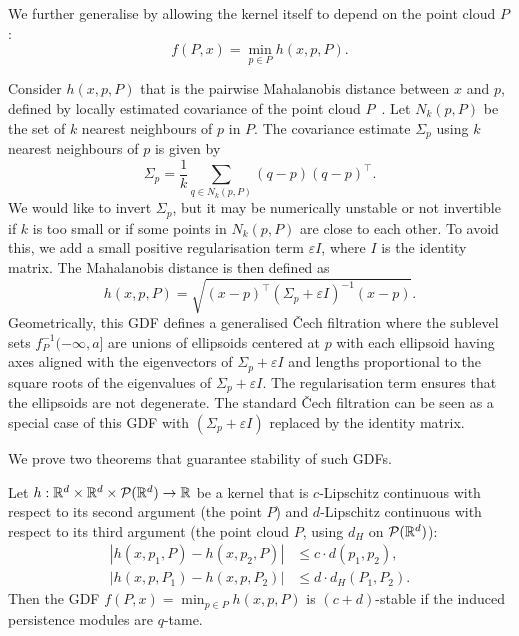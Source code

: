 We further generalise by allowing the kernel itself to depend on the point cloud
$P$:
\begin{equation}
    f(P, x) = \min_{p \in P} h(x, p, P).
\end{equation}
\begin{example}
    \label{ex:mahalanobis}
    Consider $h(x, p, P)$ that is the pairwise Mahalanobis distance between $x$
    and $p$, defined by locally estimated covariance of the point cloud
    $P$~\cite{mclachlan1999mahalanobis}.
    Let $N_k(p, P)$ be the set of $k$ nearest neighbours of $p$ in $P$. The
    covariance estimate $\Sigma_p$ using $k$ nearest neighbours of $p$ is given
    by
    \begin{equation}
        \Sigma_p = \frac{1}{k} \sum_{q \in N_k(p, P)} (q - p)(q - p)^\top.
    \end{equation}
    We would like to invert $\Sigma_p$, but it may be numerically unstable or
    not invertible if $k$ is too small or if some points in $N_k(p, P)$ are
    close to each other. To avoid this, we add a small positive
    regularisation term $\varepsilon I$, where $I$ is the identity matrix.
    The Mahalanobis distance is then defined as
    \begin{equation}
        h(x, p, P) = \sqrt{(x - p)^\top (\Sigma_p + \varepsilon I)^{-1} (x - p)}.
    \end{equation}
    Geometrically, this GDF defines a generalised \v{C}ech filtration where the
    sublevel sets $f_P^{-1}(-\infty, a]$ are unions of ellipsoids centered at
    $p$ with each ellipsoid having axes aligned with the eigenvectors of
    $\Sigma_p + \varepsilon I$ and lengths proportional to the square roots of
    the eigenvalues of $\Sigma_p + \varepsilon I$. The regularisation term
    ensures that the ellipsoids are not degenerate. The standard \v{C}ech
    filtration can be seen as a special case of this GDF with
    $(\Sigma_p + \varepsilon I)$ replaced by the identity matrix.
\end{example}
We prove two theorems that guarantee stability of such GDFs.
\begin{theorem}
    \label{thm:pc_kernel_stability}
    Let $h : \mathbb{R}^d \times \mathbb{R}^d \times \mathcal{P}(\mathbb{R}^d) \to \mathbb{R}$ be a kernel that
    is $c$-Lipschitz continuous with respect to its second argument (the point
    $P$) and $d$-Lipschitz continuous with respect to its third argument (the
    point cloud $P$, using $d_H$ on $\mathcal{P}(\mathbb{R}^d)$):
    \begin{align}
        |h(x, p_1, P) - h(x, p_2, P)| & \leq c \cdot d(p_1, p_2), \\
        |h(x, p, P_1) - h(x, p, P_2)| & \leq d \cdot d_H(P_1, P_2).
    \end{align}
    Then the GDF $f(P, x) = \min_{p\in P} h(x, p, P)$ is $(c + d)$-stable if
    the induced persistence modules are $q$-tame.
\end{theorem}
